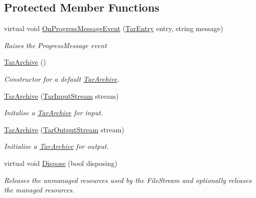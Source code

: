 \subsection*{Protected Member Functions}
\begin{DoxyCompactItemize}
\item 
virtual void \hyperlink{class_i_c_sharp_code_1_1_sharp_zip_lib_1_1_tar_1_1_tar_archive_a5ddc4195d8b5b959abe4e2603c731d22}{On\+Progress\+Message\+Event} (\hyperlink{class_i_c_sharp_code_1_1_sharp_zip_lib_1_1_tar_1_1_tar_entry}{Tar\+Entry} entry, string message)
\begin{DoxyCompactList}\small\item\em Raises the Progress\+Message event \end{DoxyCompactList}\item 
\hyperlink{class_i_c_sharp_code_1_1_sharp_zip_lib_1_1_tar_1_1_tar_archive_ace4eb3b6526d89877dbbef43ed06a597}{Tar\+Archive} ()
\begin{DoxyCompactList}\small\item\em Constructor for a default \hyperlink{class_i_c_sharp_code_1_1_sharp_zip_lib_1_1_tar_1_1_tar_archive}{Tar\+Archive}. \end{DoxyCompactList}\item 
\hyperlink{class_i_c_sharp_code_1_1_sharp_zip_lib_1_1_tar_1_1_tar_archive_a679b467332902c165b249ac00ec9534c}{Tar\+Archive} (\hyperlink{class_i_c_sharp_code_1_1_sharp_zip_lib_1_1_tar_1_1_tar_input_stream}{Tar\+Input\+Stream} stream)
\begin{DoxyCompactList}\small\item\em Initalise a \hyperlink{class_i_c_sharp_code_1_1_sharp_zip_lib_1_1_tar_1_1_tar_archive}{Tar\+Archive} for input. \end{DoxyCompactList}\item 
\hyperlink{class_i_c_sharp_code_1_1_sharp_zip_lib_1_1_tar_1_1_tar_archive_a8e96222ef98c6402a717ad06fa16b12f}{Tar\+Archive} (\hyperlink{class_i_c_sharp_code_1_1_sharp_zip_lib_1_1_tar_1_1_tar_output_stream}{Tar\+Output\+Stream} stream)
\begin{DoxyCompactList}\small\item\em Initialise a \hyperlink{class_i_c_sharp_code_1_1_sharp_zip_lib_1_1_tar_1_1_tar_archive}{Tar\+Archive} for output. \end{DoxyCompactList}\item 
virtual void \hyperlink{class_i_c_sharp_code_1_1_sharp_zip_lib_1_1_tar_1_1_tar_archive_a845871237b4030ff711ffb0fed34d469}{Dispose} (bool disposing)
\begin{DoxyCompactList}\small\item\em Releases the unmanaged resources used by the File\+Stream and optionally releases the managed resources. \end{DoxyCompactList}\end{DoxyCompactItemize}
